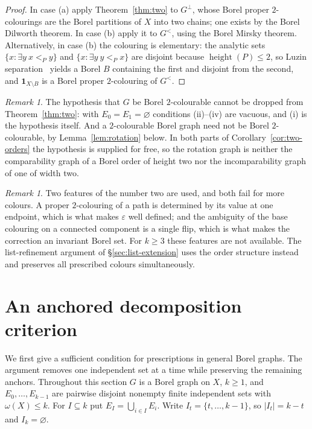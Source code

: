 \documentclass[11pt,reqno]{amsart}
\theoremstyle{plain}
\theoremstyle{definition}
\theoremstyle{remark}
\newtheorem{remark}[theorem]{Remark}
\newcommand{\hgt}{\operatorname{height}}
\newcommand{\cl}{\omega}
\begin{document}
\begin{proof}
In case (a) apply Theorem~\ref{thm:two} to $G^{\perp}$, whose Borel proper
$2$-colourings are the Borel partitions of $X$ into two chains; one exists by
the Borel Dilworth theorem. In case (b) apply it to $G^{<}$, using the Borel
Mirsky theorem. Alternatively, in case (b) the colouring is elementary: the
analytic sets $\{x:\exists y\ x<_Py\}$ and $\{x:\exists y\ y<_Px\}$ are
disjoint because $\hgt(P)\le2$, so Luzin separation~\cite[\S14]{Kechris1995}
yields a Borel $B$ containing the first and disjoint from the second, and
$\mathbf1_{X\setminus B}$ is a Borel proper $2$-colouring of $G^{<}$.
\end{proof}

\begin{remark}
\label{rem:rotation}
The hypothesis that $G$ be Borel $2$-colourable cannot be dropped from
Theorem~\ref{thm:two}: with $E_0=E_1=\varnothing$ conditions (ii)--(iv) are
vacuous, and (i) is the hypothesis itself. And a $2$-colourable Borel graph
need not be Borel $2$-colourable, by Lemma~\ref{lem:rotation} below. In both
parts of Corollary~\ref{cor:two-orders} the hypothesis is supplied for free, so
the rotation graph is neither the comparability graph of a Borel order of
height two nor the incomparability graph of one of width two.
\end{remark}

\begin{remark}
\label{rem:two-only}
Two features of the number two are used, and both fail for more colours. A
proper $2$-colouring of a path is determined by its value at one endpoint,
which is what makes $\varepsilon$ well defined; and the ambiguity of the base
colouring on a connected component is a single flip, which is what makes the
correction an invariant Borel set. For $k\ge3$ these features are not available. The list-refinement
argument of \S\ref{sec:list-extension} uses the order structure instead
and preserves all prescribed colours simultaneously.
\end{remark}

\section{An anchored decomposition criterion}
\label{subsec:many}

We first give a sufficient condition for prescriptions in general Borel
graphs. The argument removes one independent set at a time while
preserving the remaining anchors.
Throughout this section $G$ is a Borel graph on $X$, $k\ge1$, and
$E_0,\dots,E_{k-1}$ are pairwise disjoint nonempty finite independent sets
with $\cl(X)\le k$. For $I\subseteq k$ put $E_I=\bigcup_{i\in I}E_i$.
Write $I_t=\{t,\dots,k-1\}$, so $|I_t|=k-t$ and $I_k=\varnothing$.
\end{document}
